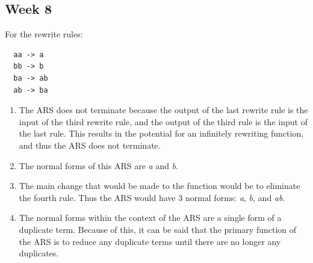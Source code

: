 \documentclass{article}
\theoremstyle{theorem}
\theoremstyle{definition}
\theoremstyle{remark}
\begin{document}
\subsection{Week 8}
For the rewrite rules:
\begin{lstlisting}
  aa -> a
  bb -> b
  ba -> ab
  ab -> ba
\end{lstlisting}
\begin{enumerate}
    \item The ARS does not terminate because the output of the last rewrite rule is the input of the third rewrite rule, and the output of the third rule is the input of the last rule. This results in the potential for an infinitely rewriting function, and thus the ARS does not terminate.
    \item The normal forms of this ARS are \textit{a} and \textit{b}.
    \item The main change that would be made to the function would be to eliminate the fourth rule. Thus the ARS would have 3 normal forms: \textit{a}, \textit{b}, and \textit{ab}.
    \item The normal forms within the context of the ARS are a single form of a duplicate term. Because of this, it can be said that the primary function of the ARS is to reduce any duplicate terms until there are no longer any duplicates.
\end{enumerate}
\end{document}
